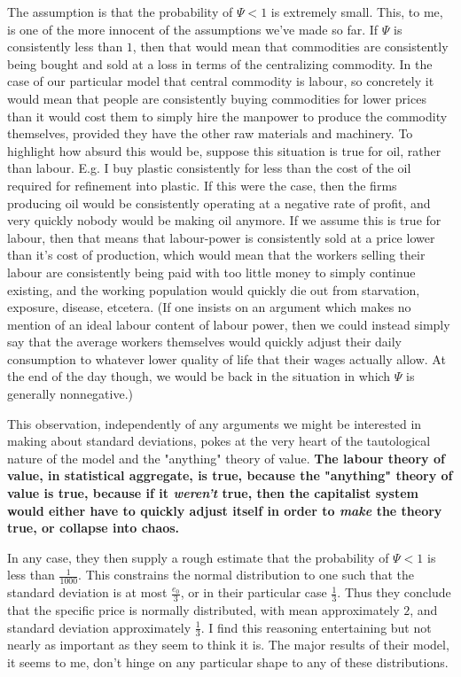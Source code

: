 \documentclass{article}
\theoremstyle{definition}
\theoremstyle{plain}
\theoremstyle{theorem}
\begin{document}
The assumption is that the probability of $\Psi < 1$ is extremely small. This, to me, is one of the more innocent of the assumptions we've made so far. If $\Psi$ is consistently less than $1$, then that would mean that commodities are consistently being bought and sold at a loss in terms of the centralizing commodity. In the case of our particular model that central commodity is labour, so concretely it would mean that people are consistently buying commodities for lower prices than it would cost them to simply hire the manpower to produce the commodity themselves, provided they have the other raw materials and machinery. To highlight how absurd this would be, suppose this situation is true for oil, rather than labour. E.g. I buy plastic consistently for less than the cost of the oil required for refinement into plastic. If this were the case, then the firms producing oil would be consistently operating at a negative rate of profit, and very quickly nobody would be making oil anymore. If we assume this is true for labour, then that means that labour-power is consistently sold at a price lower than it's cost of production, which would mean that the workers selling their labour are consistently being paid with too little money to simply continue existing, and the working population would quickly die out from starvation, exposure, disease, etcetera. (If one insists on an argument which makes no mention of an ideal labour content of labour power, then we could instead simply say that the average workers themselves would quickly adjust their daily consumption to whatever lower quality of life that their wages actually allow. At the end of the day though, we would be back in the situation in which $\Psi$ is generally nonnegative.)  \par 
 This observation, independently of any arguments we might be interested in making about standard deviations, pokes at the very heart of the tautological nature of the model and the "anything" theory of value. \textbf{The labour theory of value, in statistical aggregate, is true, because the "anything" theory of value is true, because if it \textit{weren't} true, then the capitalist system would either have to quickly adjust itself in order to \textit{make} the theory true, or collapse into chaos.} \par 
 In any case, they then supply a rough estimate that the probability of $\Psi < 1$ is less than $\frac{1}{1000}$. This constrains the normal distribution to one such that the standard deviation is at most $\frac{e_0}{3}$, or in their particular case $\frac{1}{3}$. Thus they conclude that the specific price is normally distributed, with mean approximately $2$, and standard deviation approximately $\frac{1}{3}$. I find this reasoning entertaining but not nearly as important as they seem to think it is. The major results of their model, it seems to me, don't hinge on any particular shape to any of these distributions. 
\end{document}
